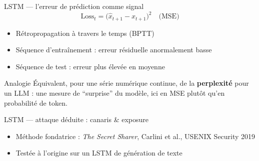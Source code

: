 \documentclass[11pt]{beamer}
\begin{document}
\begin{frame}{LSTM --- l'erreur de prédiction comme signal}
  \[
    \text{Loss}_t = \big(\hat{x}_{t+1} - x_{t+1}\big)^2 \quad \text{(MSE)}
  \]
  \begin{itemize}
    \item Rétropropagation à travers le temps (BPTT)
    \item Séquence d'entraînement : erreur résiduelle anormalement basse
    \item Séquence de test : erreur plus élevée en moyenne
  \end{itemize}
  \begin{block}{Analogie}
    Équivalent, pour une série numérique continue, de la
    \textbf{perplexité} pour un LLM : une mesure de ``surprise''
    du modèle, ici en MSE plutôt qu'en probabilité de token.
  \end{block}
\end{frame}

\begin{frame}{LSTM --- attaque déduite : canaris \& exposure}
  \begin{center}
  \end{center}
  \begin{itemize}
    \item Méthode fondatrice : \emph{The Secret Sharer}, Carlini et al., USENIX Security 2019
    \item Testée à l'origine sur un LSTM de génération de texte
  \end{itemize}
\end{frame}
\end{document}
